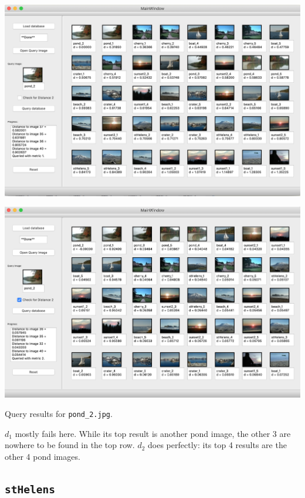 \documentclass[letterpaper]{article}
\begin{document}
\begin{center}
  \includegraphics[width=\textwidth]{pond_2_distance1.png}
  
  \includegraphics[width=\textwidth]{pond_2_distance2.png}
  
  Query results for \texttt{pond\_2.jpg}.  
\end{center}

$d_1$ mostly fails here. While its top result is another pond image, the other 3
are nowhere to be found in the top row. $d_2$ does perfectly: its top 4 results
are the other 4 pond images.

\subsection{\texttt{stHelens}}
\end{document}
